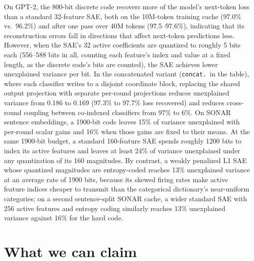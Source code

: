\documentclass[11pt]{article}
\begin{document}
On GPT-2, the 800-bit discrete code recovers more of the model's
next-token loss than a standard 32-feature SAE, both on the 10M-token
training cache (97.0\% vs.\ 96.2\%) and after one pass over 40M tokens
(97.5--97.6\%), indicating that its reconstruction errors fall in
directions that affect next-token predictions less. However, when the
SAE's 32 active coefficients are quantized to roughly 5 bits each
(556--588 bits in all, counting each feature's index and value at a fixed
length, as the discrete code's bits are counted), the SAE achieves lower
unexplained variance per bit. In the concatenated variant (\texttt{concat.}\ in the table), where
each classifier writes to a disjoint coordinate block, replacing the
shared output projection with separate per-round projections reduces
unexplained variance from 0.186 to 0.169 (97.3\% to 97.7\% loss
recovered) and reduces cross-round coupling between co-indexed classifiers
from 97\% to 6\%. On SONAR sentence embeddings, a 1900-bit code leaves
15\% of variance unexplained with per-round scalar gains and 16\% when
those gains are fixed to their means. At the same 1900-bit budget, a
standard 160-feature SAE spends roughly 1200 bits to index its active
features and leaves at least 24\% of variance unexplained under any
quantization of its 160 magnitudes. By contrast, a weakly penalized L1 SAE
whose quantized magnitudes are entropy-coded reaches 13\% unexplained
variance at an average rate of 1900 bits, because its skewed firing rates
make active feature indices cheaper to transmit than the categorical
dictionary's near-uniform categories; on a second sentence-split SONAR
cache, a wider standard SAE with 256 active features and entropy coding similarly reaches
13\% unexplained variance against 16\% for the hard code.

\section*{What we can claim}
\end{document}
